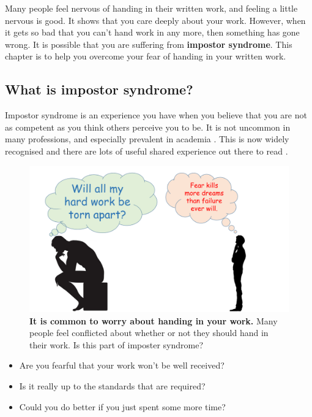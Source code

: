 \documentclass[
]{krantz}
\providecommand{\tightlist}{%
  \setlength{\itemsep}{0pt}\setlength{\parskip}{0pt}}
\begin{document}
Many people feel nervous of handing in their written work, and feeling a little nervous is good. It shows that you care deeply about your work. However, when it gets so bad that you can't hand work in any more, then something has gone wrong. It is possible that you are suffering from \textbf{impostor syndrome}. This chapter is to help you overcome your fear of handing in your written work.

\hypertarget{impostorsyndrome}{%
\subsection{What is impostor syndrome?}\label{impostorsyndrome}}

Impostor syndrome is an experience you have when you believe that you are not as competent as you think others perceive you to be. It is not uncommon in many professions, and especially prevalent in academia \citep{clance1978imposter}. This is now widely recognised and there are lots of useful shared experience out there to read \citep[e.g.][]{dickerson2019how}.



\begin{figure}
\includegraphics[width=0.95\linewidth]{figures/conflicted} \caption{\textbf{It is common to worry about handing in your work.} Many people feel conflicted about whether or not they should hand in their work. Is this part of imposter syndrome?}\label{fig:conflicted}
\end{figure}

\begin{itemize}
\tightlist
\item
  Are you fearful that your work won't be well received?
\item
  Is it really up to the standards that are required?
\item
  Could you do better if you just spent some more time?
\end{itemize}
\end{document}
